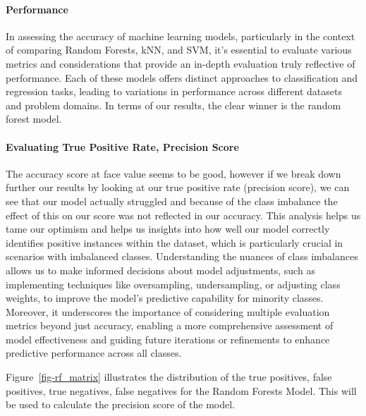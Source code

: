 \documentclass[
  letterpaper,
  DIV=11,
  numbers=noendperiod]{scrartcl}
\let\oldparagraph\paragraph
\renewcommand{\paragraph}[1]{\oldparagraph{#1}\mbox{}}
\begin{document}
\paragraph{Performance}\label{performance}

In assessing the accuracy of machine learning models, particularly in
the context of comparing Random Forests, kNN, and SVM, it's essential to
evaluate various metrics and considerations that provide an in-depth
evaluation truly reflective of performance. Each of these models offers
distinct approaches to classification and regression tasks, leading to
variations in performance across different datasets and problem domains.
In terms of our results, the clear winner is the random forest model.

\paragraph{Evaluating True Positive Rate, Precision
Score}\label{evaluating-true-positive-rate-precision-score}

The accuracy score at face value seems to be good, however if we break
down further our results by looking at our true positive rate (precision
score), we can see that our model actually struggled and because of the
class imbalance the effect of this on our score was not reflected in our
accuracy. This analysis helps us tame our optimism and helps us insights
into how well our model correctly identifies positive instances within
the dataset, which is particularly crucial in scenarios with imbalanced
classes. Understanding the nuances of class imbalances allows us to make
informed decisions about model adjustments, such as implementing
techniques like oversampling, undersampling, or adjusting class weights,
to improve the model's predictive capability for minority classes.
Moreover, it underscores the importance of considering multiple
evaluation metrics beyond just accuracy, enabling a more comprehensive
assessment of model effectiveness and guiding future iterations or
refinements to enhance predictive performance across all classes.

Figure~\ref{fig-rf_matrix} illustrates the distribution of the true
positives, false positives, true negatives, false negatives for the
Random Forests Model. This will be used to calculate the precision score
of the model.
\end{document}

